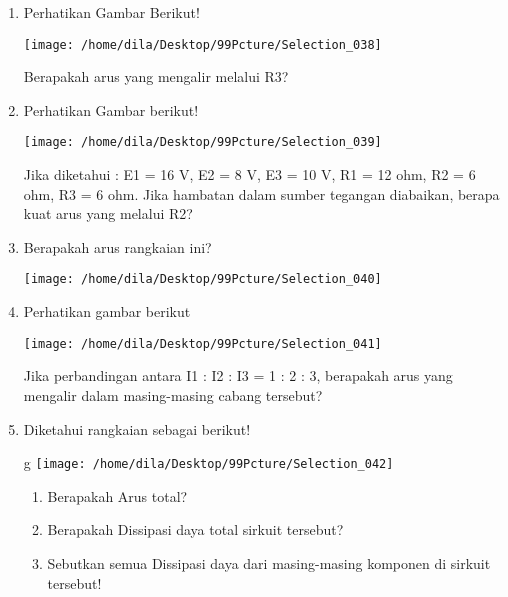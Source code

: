 \documentclass[12pt,a4paper,draft,final,oneside,twoside,openright,openany]{article}
\begin{document}
				\begin{enumerate}
					\item Perhatikan Gambar Berikut!
						\begin{center}
							\texttt{[image: /home/dila/Desktop/99Pcture/Selection\_038]}
						\end{center}
						Berapakah arus yang mengalir melalui R3?
					\item Perhatikan Gambar berikut!
						\begin{center}
							\texttt{[image: /home/dila/Desktop/99Pcture/Selection\_039]}
						\end{center}
						Jika diketahui :
						E1 = 16 V,
						E2 = 8 V,
						E3 = 10 V,
						R1 = 12 ohm,
						R2 = 6 ohm,
						R3 = 6 ohm. Jika hambatan dalam sumber tegangan diabaikan, berapa kuat arus yang melalui R2?
					\item Berapakah arus rangkaian ini?
						\begin{center}
							\texttt{[image: /home/dila/Desktop/99Pcture/Selection\_040]}
						\end{center}
					\item Perhatikan gambar berikut
					
					\begin{center}
						\texttt{[image: /home/dila/Desktop/99Pcture/Selection\_041]}
					\end{center}
					Jika perbandingan antara I1 : I2 : I3 = 1 : 2 : 3, berapakah arus yang mengalir dalam masing-masing cabang tersebut?
					\item Diketahui rangkaian sebagai berikut!
					\begin{center}g
						\texttt{[image: /home/dila/Desktop/99Pcture/Selection\_042]}
					\end{center}
					\begin{enumerate}
						\item Berapakah Arus total?
						\item Berapakah Dissipasi daya total sirkuit tersebut?
						\item Sebutkan semua Dissipasi daya dari masing-masing komponen di sirkuit tersebut!
					\end{enumerate}
						
						
				\end{enumerate}
\end{document}

